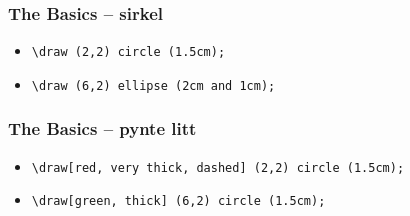 \documentclass{beamer}
\begin{document}
\begin{frame}[fragile]
\frametitle{The Basics -- sirkel}
\begin{center}
\end{center}

\vspace{20pt}

\begin{itemize}
\item
\begin{Verbatim}[fontsize=\small]
\draw (2,2) circle (1.5cm);
\end{Verbatim}

\item
\begin{Verbatim}[fontsize=\small]
\draw (6,2) ellipse (2cm and 1cm);
\end{Verbatim}
\end{itemize}

\end{frame}

\begin{frame}[fragile]
\frametitle{The Basics -- pynte litt}
\begin{center}
\end{center}

\vspace{20pt}

\begin{itemize}
\item
\begin{Verbatim}[fontsize=\small]
\draw[red, very thick, dashed] (2,2) circle (1.5cm);
\end{Verbatim}

\item
\begin{Verbatim}[fontsize=\small]
\draw[green, thick] (6,2) circle (1.5cm);
\end{Verbatim}
\end{itemize}

\end{frame}
\end{document}
